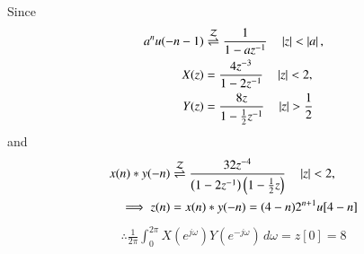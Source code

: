 Since 
\begin{align}\label{ec/2021/41/Z1}
a^nu(-n-1) &\overset{\mathcal{Z}}{ \rightleftharpoons} \frac{1}{1-az^{-1}}  \quad \left\vert z\right\vert < \left\vert a\right\vert,
\\
X(z) &=  \frac{4z^{-3}}{1-2z^{-1}}  \quad \left\vert z\right\vert < 2,
\\
Y(z) &= \frac{8z}{1-\frac{1}{2}z^{-1}}  \quad \left\vert z\right\vert > \frac{1}{2}
    \end{align}
and     
\begin{align}\label{ec/2021/41/Zf}
x(n)*y(-n) &\overset{\mathcal{Z}}{ \rightleftharpoons} \frac{32z^{-4}}{\left(1-2z^{-1}\right)\left(1-\frac{1}{2}z\right)} \quad  \left\vert z\right\vert < 2,
\\
\implies z(n) &= x(n)*y(-n) =  (4-n)2^{n+1}u[4-n]
        \end{align}
\begin{align}
    \therefore \frac{1}{2\pi} \int_{0}^{2\pi} X(e^{j\omega}) Y(e^{-j\omega}) \, d\omega =z[0]=8
\end{align}
